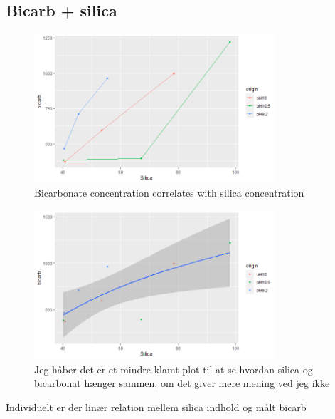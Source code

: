 \subsection{Bicarb + silica}
\begin{figure}[H]
    \centering
    \includegraphics[width=0.8\textwidth]{Billeder/data/multi_salt/silica_bicarb_individual.png}
    \caption{Bicarbonate concentration correlates with silica concentration}
    \label{fig:multi_salt_bicarbonate_silica_releation_individual}
\end{figure}

\begin{figure}[H]
    \centering
    \includegraphics[width=0.8\textwidth]{Billeder/data/multi_salt/silica_bicarb_samlet.png}
    \caption{Jeg håber det er et mindre klamt plot til at se hvordan silica og bicarbonat hænger sammen, om det giver mere mening ved jeg ikke}
    \label{fig:multi_salt_bicarbonate_+_silica_less_ugly}
\end{figure}

 Individuelt er der linær relation mellem silica indhold og målt bicarb


